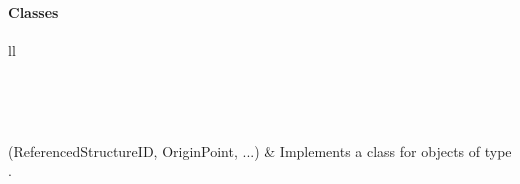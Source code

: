\documentclass[letterpaper,10pt,english]{sphinxmanual}
\begin{document}
\paragraph{Classes}
\label{Chapters/PythonModuleReference/Patterns/TXLWizard.Patterns.Array:classes}
\begin{longtable}{ll}
\hline
\endfirsthead

%
{{}} \\
\hline
\endhead

\hline {} \\ \hline
\endfoot

\endlastfoot


{\hyperref[Chapters/PythonModuleReference/Patterns/TXLWizard.Patterns.Array:TXLWizard.Patterns.Array.Array]{}}(ReferencedStructureID, OriginPoint, ...)
 & 
Implements a class for  objects of type .
\\
\hline\end{longtable}

\end{document}
